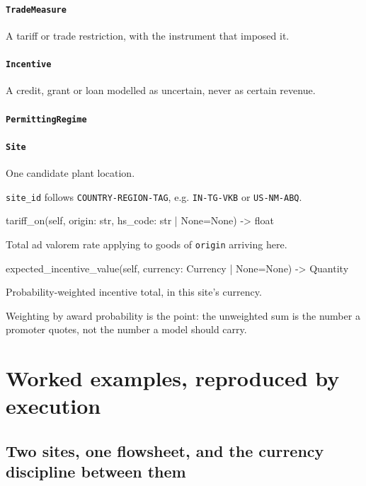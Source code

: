 \documentclass[10pt,a4paper,twoside]{report}
\begin{document}
\paragraph{\texttt{TradeMeasure}}

A tariff or trade restriction, with the instrument that imposed it.

\paragraph{\texttt{Incentive}}

A credit, grant or loan modelled as uncertain, never as certain revenue.

\paragraph{\texttt{PermittingRegime}}

\paragraph{\texttt{Site}}

One candidate plant location.

\texttt{site\_id} follows \texttt{COUNTRY-REGION-TAG}, e.g. \texttt{IN-TG-VKB} or \texttt{US-NM-ABQ}.

\begin{verbatimsmall}
tariff_on(self, origin: str, hs_code: str | None=None) -> float
\end{verbatimsmall}

Total ad valorem rate applying to goods of \texttt{origin} arriving here.

\begin{verbatimsmall}
expected_incentive_value(self, currency: Currency | None=None) -> Quantity
\end{verbatimsmall}

Probability-weighted incentive total, in this site's currency.

Weighting by award probability is the point: the unweighted sum is the number a promoter quotes, not the number a model should carry.

\section{Worked examples, reproduced by execution}

\subsection*{Two sites, one flowsheet, and the currency discipline between them}
\end{document}
